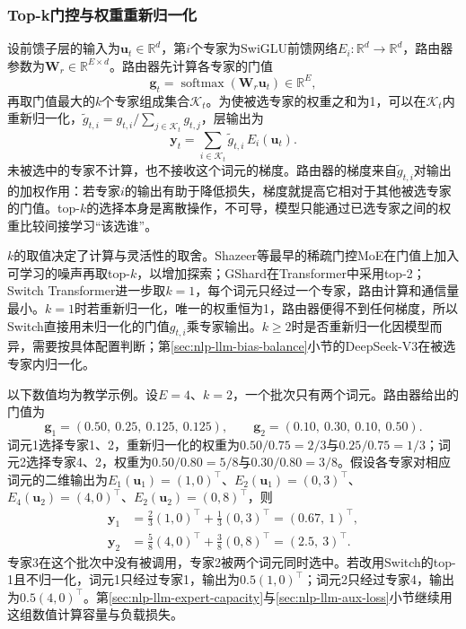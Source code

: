 \subsubsection{Top-k门控与权重重新归一化}
\label{sec:nlp-llm-topk-gating}

设前馈子层的输入为$\bm u_t\in\mathbb R^d$，第$i$个专家为SwiGLU前馈网络$E_i:\mathbb R^d\to\mathbb R^d$，路由器参数为$\bm W_r\in\mathbb R^{E\times d}$。路由器先计算各专家的门值
\begin{equation}
 \bm g_t=\operatorname{softmax}(\bm W_r\bm u_t)\in\mathbb R^{E},
 \label{eq:nlp-llm-moe-gate}
\end{equation}
再取门值最大的$k$个专家组成集合$\mathcal K_t$。为使被选专家的权重之和为1，可以在$\mathcal K_t$内重新归一化，$\tilde g_{t,i}=g_{t,i}/\sum_{j\in\mathcal K_t}g_{t,j}$，层输出为
\begin{equation}
 \bm y_t=\sum_{i\in\mathcal K_t}\tilde g_{t,i}\,E_i(\bm u_t).
 \label{eq:nlp-llm-moe}
\end{equation}
未被选中的专家不计算，也不接收这个词元的梯度。路由器的梯度来自$\tilde g_{t,i}$对输出的加权作用：若专家$i$的输出有助于降低损失，梯度就提高它相对于其他被选专家的门值。top-$k$的选择本身是离散操作，不可导，模型只能通过已选专家之间的权重比较间接学习“该选谁”。

$k$的取值决定了计算与灵活性的取舍。Shazeer等最早的稀疏门控MoE在门值上加入可学习的噪声再取top-$k$，以增加探索；GShard在Transformer中采用top-2；Switch Transformer进一步取$k=1$，每个词元只经过一个专家，路由计算和通信量最小。$k=1$时若重新归一化，唯一的权重恒为1，路由器便得不到任何梯度，所以Switch直接用未归一化的门值$g_{t,i}$乘专家输出。$k\geq2$时是否重新归一化因模型而异，需要按具体配置判断；第\ref{sec:nlp-llm-bias-balance}小节的DeepSeek-V3在被选专家内归一化。

\begin{example}
  \label{ex:nlp-llm-moe-routing}
  以下数值均为教学示例。设$E=4$、$k=2$，一个批次只有两个词元。路由器给出的门值为
  \[
   \bm g_1=(0.50,\ 0.25,\ 0.125,\ 0.125),\qquad
   \bm g_2=(0.10,\ 0.30,\ 0.10,\ 0.50).
  \]
  词元1选择专家1、2，重新归一化的权重为$0.50/0.75=2/3$与$0.25/0.75=1/3$；词元2选择专家4、2，权重为$0.50/0.80=5/8$与$0.30/0.80=3/8$。假设各专家对相应词元的二维输出为$E_1(\bm u_1)=(1,0)^{\top}$、$E_2(\bm u_1)=(0,3)^{\top}$、$E_4(\bm u_2)=(4,0)^{\top}$、$E_2(\bm u_2)=(0,8)^{\top}$，则
  \[
   \begin{aligned}
   \bm y_1&=\tfrac23(1,0)^{\top}+\tfrac13(0,3)^{\top}=(0.67,\ 1)^{\top},\\
   \bm y_2&=\tfrac58(4,0)^{\top}+\tfrac38(0,8)^{\top}=(2.5,\ 3)^{\top}.
   \end{aligned}
  \]
  专家3在这个批次中没有被调用，专家2被两个词元同时选中。若改用Switch的top-1且不归一化，词元1只经过专家1，输出为$0.5(1,0)^{\top}$；词元2只经过专家4，输出为$0.5(4,0)^{\top}$。第\ref{sec:nlp-llm-expert-capacity}与\ref{sec:nlp-llm-aux-loss}小节继续用这组数值计算容量与负载损失。
\end{example}


